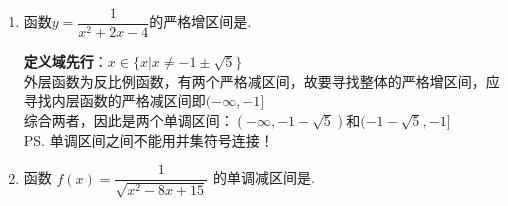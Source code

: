\begin{enumerate}
\begin{enumerate}
    \item 函数$y = \dfrac{1}{x^2+2x-4}$的严格增区间是\blkda[5.5]{$(-\infty,-1-\sqrt{5})$和$(-1-\sqrt{5}, -1]$}. 
    \begin{jieda}
        \textbf{定义域先行}：$x \in \{x | x \neq -1\pm \sqrt{5}\}$ \\
        外层函数为反比例函数，有两个严格减区间，故要寻找整体的严格增区间，应寻找内层函数的严格减区间即$(-\infty,-1]$ \\
        综合两者，因此是两个单调区间：$(-\infty,-1-\sqrt{5})$和$(-1-\sqrt{5}, -1]$ \\
        \ps 单调区间之间不能用并集符号连接！
    \end{jieda}
    \item 函数 $f(x)=\dfrac{1}{\sqrt{x^2-8 x+15}}$ 的单调减区间是.
    

\end{enumerate}
\end{enumerate}
